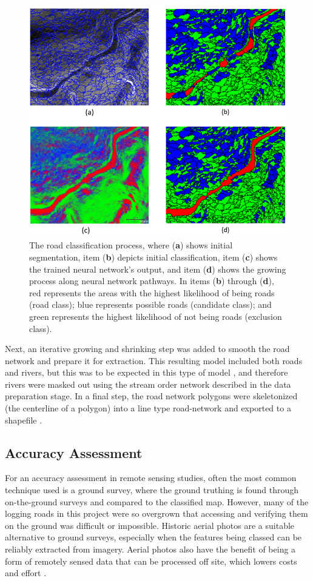 \documentclass[remotesensing,article,accept,pdftex,moreauthors]{Definitions/mdpi}
\begin{document}
\begin{figure}[H]
\includegraphics[width=12 cm]{classify.png}

\caption{ The road classification process, where (\textbf{a}) shows initial segmentation, item (\textbf{b}) depicts initial classification, item (\textbf{c}) shows the trained neural network's output, and item (\textbf{d}) shows the growing process along neural network pathways. In items (\textbf{b}) through (\textbf{d}), red represents the areas with the highest likelihood of being roads (road class); blue represents possible roads (candidate class); and green represents the highest likelihood of not being roads (exclusion class).}\label{fig7}
\end{figure}

Next, an iterative growing and shrinking step was added to smooth the road network and prepare it for extraction. This resulting model included both roads and rivers, but this was to be expected in this type of model \cite{sherba}, and therefore rivers were masked out using the stream order network described in the data preparation stage. In a final step, the road network polygons were skeletonized (the centerline of a polygon) into a line type road-network and exported to a shapefile \cite{lewandowicz}. 
\subsection{Accuracy Assessment}


For an accuracy assessment in remote sensing studies, often the most common technique used is a ground survey, where the ground truthing is found through on-the-ground surveys and compared to the classified map. However, many of the logging roads in this project were so overgrown that accessing and verifying them on the ground was difficult or impossible. Historic aerial photos are a suitable alternative to ground surveys, especially when the features being classed can be reliably extracted from imagery. Aerial photos also have the benefit of being a form of remotely sensed data that can be processed off site, which lowers costs and effort \cite{lillesand}.  
\end{document}
